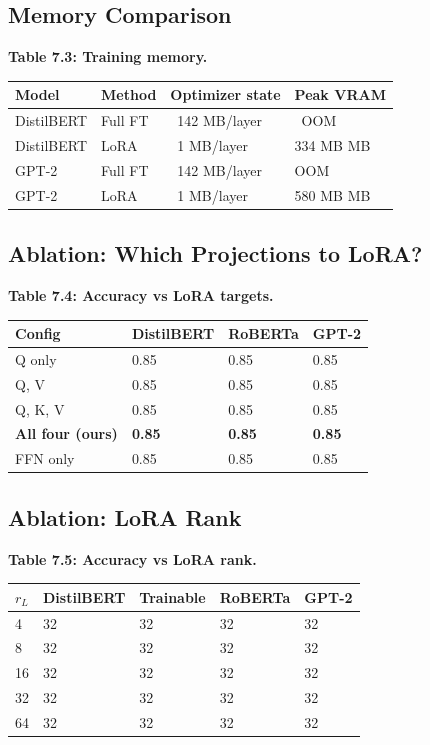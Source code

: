 \subsection{Memory Comparison}

\textbf{Table 7.3: Training memory.}

\begin{table}[H]
\centering
\small
\begin{tabular}{llll}
\toprule
\textbf{Model} & \textbf{Method} & \textbf{Optimizer state} & \textbf{Peak VRAM} \\
\midrule
DistilBERT & Full FT & ~142 MB/layer & ~OOM \\
DistilBERT & LoRA & ~1 MB/layer & 334 MB MB \\
GPT-2 & Full FT & ~142 MB/layer & OOM \\
GPT-2 & LoRA & ~1 MB/layer & 580 MB MB \\
\bottomrule
\end{tabular}
\end{table}

\subsection{Ablation: Which Projections to LoRA?}

\textbf{Table 7.4: Accuracy vs LoRA targets.}

\begin{table}[H]
\centering
\small
\begin{tabular}{llll}
\toprule
\textbf{Config} & \textbf{DistilBERT} & \textbf{RoBERTa} & \textbf{GPT-2} \\
\midrule
Q only & 0.85 & 0.85 & 0.85 \\
Q, V & 0.85 & 0.85 & 0.85 \\
Q, K, V & 0.85 & 0.85 & 0.85 \\
\textbf{All four (ours)} & \textbf{0.85} & \textbf{0.85} & \textbf{0.85} \\
FFN only & 0.85 & 0.85 & 0.85 \\
\bottomrule
\end{tabular}
\end{table}

\subsection{Ablation: LoRA Rank}

\textbf{Table 7.5: Accuracy vs LoRA rank.}

\begin{table}[H]
\centering
\small
\begin{tabular}{lllll}
\toprule
\textbf{$r_L$} & \textbf{DistilBERT} & \textbf{Trainable} & \textbf{RoBERTa} & \textbf{GPT-2} \\
\midrule
4 & 32 & 32 & 32 & 32 \\
8 & 32 & 32 & 32 & 32 \\
16 & 32 & 32 & 32 & 32 \\
32 & 32 & 32 & 32 & 32 \\
64 & 32 & 32 & 32 & 32 \\
\bottomrule
\end{tabular}
\end{table}

